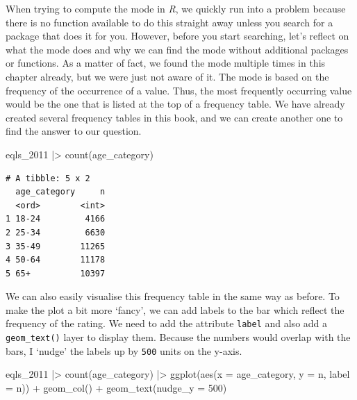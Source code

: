 \documentclass[
  letterpaper,
  DIV=11,
  numbers=noendperiod]{scrreprt}
\newenvironment{Shaded}{\begin{snugshade}}{\end{snugshade}}
\newcommand{\AttributeTok}[1]{\textcolor[rgb]{0.40,0.45,0.13}{#1}}
\newcommand{\DecValTok}[1]{\textcolor[rgb]{0.68,0.00,0.00}{#1}}
\newcommand{\FunctionTok}[1]{\textcolor[rgb]{0.28,0.35,0.67}{#1}}
\newcommand{\NormalTok}[1]{\textcolor[rgb]{0.00,0.23,0.31}{#1}}
\newcommand{\SpecialCharTok}[1]{\textcolor[rgb]{0.37,0.37,0.37}{#1}}
\begin{document}
When trying to compute the mode in \emph{R}, we quickly run into a
problem because there is no function available to do this straight away
unless you search for a package that does it for you. However, before
you start searching, let's reflect on what the mode does and why we can
find the mode without additional packages or functions. As a matter of
fact, we found the mode multiple times in this chapter already, but we
were just not aware of it. The mode is based on the frequency of the
occurrence of a value. Thus, the most frequently occurring value would
be the one that is listed at the top of a frequency table. We have
already created several frequency tables in this book, and we can create
another one to find the answer to our question.

\begin{Shaded}
\begin{Highlighting}[]
\NormalTok{eqls\_2011 }\SpecialCharTok{|\textgreater{}} \FunctionTok{count}\NormalTok{(age\_category)}
\end{Highlighting}
\end{Shaded}

\begin{verbatim}
# A tibble: 5 x 2
  age_category     n
  <ord>        <int>
1 18-24         4166
2 25-34         6630
3 35-49        11265
4 50-64        11178
5 65+          10397
\end{verbatim}

We can also easily visualise this frequency table in the same way as
before. To make the plot a bit more `fancy', we can add labels to the
bar which reflect the frequency of the rating. We need to add the
attribute \texttt{label} and also add a \texttt{geom\_text()} layer to
display them. Because the numbers would overlap with the bars, I `nudge'
the labels up by \texttt{500} units on the y-axis.

\begin{Shaded}
\begin{Highlighting}[]
\NormalTok{eqls\_2011 }\SpecialCharTok{|\textgreater{}}
  \FunctionTok{count}\NormalTok{(age\_category) }\SpecialCharTok{|\textgreater{}}
  \FunctionTok{ggplot}\NormalTok{(}\FunctionTok{aes}\NormalTok{(}\AttributeTok{x =}\NormalTok{ age\_category,}
             \AttributeTok{y =}\NormalTok{ n,}
             \AttributeTok{label =}\NormalTok{ n)) }\SpecialCharTok{+}
  \FunctionTok{geom\_col}\NormalTok{() }\SpecialCharTok{+}
  \FunctionTok{geom\_text}\NormalTok{(}\AttributeTok{nudge\_y =} \DecValTok{500}\NormalTok{)}
\end{Highlighting}
\end{Shaded}
\end{document}
